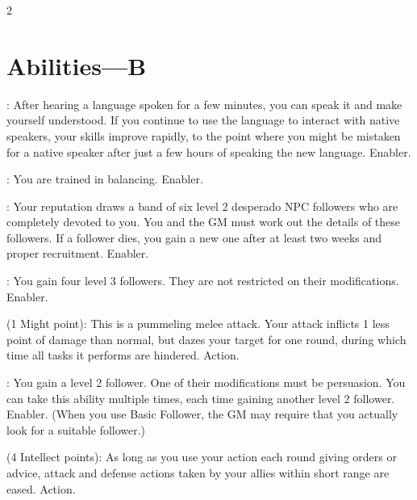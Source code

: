 \begin{multicols}{2}

\section{Abilities—B}

: After hearing a language spoken for a few minutes, you can speak it and make yourself understood. If you continue to use the language to interact with native speakers, your skills improve rapidly, to the point where you might be mistaken for a native speaker after just a few hours of speaking the new language. Enabler. 

: You are trained in balancing. Enabler. 

: Your reputation draws a band of six level 2 desperado NPC followers who are completely devoted to you. You and the GM must work out the details of these followers. If a follower dies, you gain a new one after at least two weeks and proper recruitment. Enabler.

: You gain four level 3 followers. They are not restricted on their modifications. Enabler. 

 (1 Might point): This is a pummeling melee attack. Your attack inflicts 1 less point of damage than normal, but dazes your target for one round, during which time all tasks it performs are hindered. Action. 

: You gain a level 2 follower. One of their modifications must be persuasion. You can take this ability multiple times, each time gaining another level 2 follower. Enabler. (When you use Basic Follower, the GM may require that you actually look for a suitable follower.)

 (4 Intellect points): As long as you use your action each round giving orders or advice, attack and defense actions taken by your allies within short range are eased. Action. 


\end{multicols}
